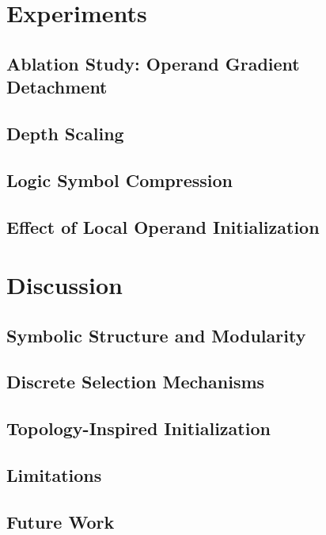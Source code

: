 \documentclass{article}
\begin{document}
\section{Experiments}\label{sec:experiments}
    
  \subsection{Ablation Study: Operand Gradient Detachment}
    
  \subsection{Depth Scaling}\label{subsec:Depth Scaling}
    
  \subsection{Logic Symbol Compression}
    
  \subsection{Effect of Local Operand Initialization}
    
\section{Discussion}
  \subsection{Symbolic Structure and Modularity}
    
  \subsection{Discrete Selection Mechanisms}
    
  \subsection{Topology-Inspired Initialization}
    
  \subsection{Limitations}
    
  \subsection{Future Work}
    
\end{document}
